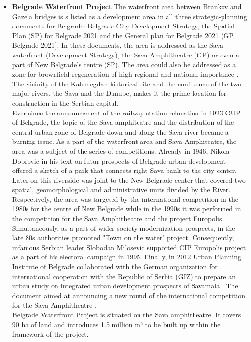 \documentclass[11pt]{report}
\begin{document}
\begin{itemize}
\item \textbf{Belgrade Waterfront Project}
The waterfront area between Brankov and Gazela bridges is s  listed  as  a development  area  in  all  three  strategic-planning documents for Belgrade: Belgrade City Development Strategy, the Spatial Plan (SP) for Belgrade 2021 and the General plan for Belgrade 2021 (GP Belgrade 2021). In these documents, the area is addressed as the Sava waterfront (Development Strategy), the Sava Amphitheatre (GP) or even a part of New Belgrade’s centre (SP).
The area could also be addressed as a zone for brownfield regeneration of high regional and national importance \cite{Peric 2016}. The vicinity of the Kalemegdan historical site and the confluence of the two major rivers, the Sava and the Danube, makes it the prime location for construction in the Serbian capital.
\\
Ever since the announcement of the railway station relocation in 1923 GUP of Belgrade, the topic of the Sava amphiteatre and the distribution of the central urban zone of Belgrade down and along the Sava river became a burning issue. As a part of the waterfront area and Sava Amphiteatre, the area was a subject of the series of competitions.
Already in 1946, Nikola Dobrovic  in his text on futur prospects of Belgrade urban development offered a sketch of a park that connects right Sava bank to the city center. Later on this riverside was joint to the New Belgrade center that covered two  spatial,  geomorphological  and  administrative units divided by the River. Respectively, the area was targeted by the  international  competition in the 1980s for the centre of New Belgrade while in the 1990s  it  was  performed  in  the  competition  for  the 
Sava Amphitheatre and the project Europolis.
Simultaneously, as a part of wider society modernization prospects, in the late 80s authorities promoted "Town on the water" project. Consequently, infamous Serbian leader Slobodan Milosevic supported CIP Europolis project as a part of his electoral campaign in 1995.
Finally, in 2012 Urban Planning Institute of Belgrade collaborated with the German organization for international cooperation with the Republic of Serbia (GIZ) to prepare an urban study on integrated urban development prospects of Savamala \cite{Zaklina document}. The document aimed at announcing a new round of the international competition for the Sava Amphitheatre \cite{Vukmirovic in Doytchinov et al 2015}.
\\
Belgrade Waterfront Project is situated on the Sava amphitheatre. It covers 90 ha of land and introduces 1.5 million m² to be built up within the framework of the project.

\end{itemize}
\end{document}
